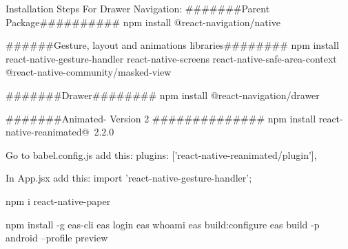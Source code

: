 Installation Steps For Drawer Navigation:
#######Parent Package##########
npm install @react-navigation/native

######Gesture, layout and animations libraries########
npm install react-native-gesture-handler react-native-screens react-native-safe-area-context @react-native-community/masked-view

#######Drawer########
npm install @react-navigation/drawer

#######Animated- Version 2 ##############
npm install react-native-reanimated@~2.2.0

Go to babel.config.js add this:
plugins: ['react-native-reanimated/plugin'],

In App.jsx add this:
import 'react-native-gesture-handler';

npm i react-native-paper

npm install -g eas-cli
eas login
eas whoami
eas build:configure
eas build -p android --profile preview